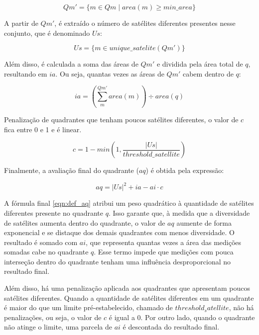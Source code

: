 \documentclass[cic,tc]{iiufrgs}
\begin{document}
\begin{equation} \label{eqn:def_qm_line}
Qm' = \{ m \in Qm \mid area\left(m\right) \ge min\_area \}
\end{equation}

A partir de $Qm'$, é extraído o número de satélites diferentes presentes nesse conjunto, que é denominado $Us$: \par

\begin{equation} \label{eqn:def_us}
Us = \{ m \in unique\_satelite\left(Qm'\right) \}
\end{equation}

Além disso, é calculada a soma das áreas de $Qm'$ e dividida pela área total de $q$, resultando em $ia$. Ou seja, quantas vezes as áreas de $Qm'$ cabem dentro de $q$: \par

\begin{equation} \label{eqn:def_ia}
ia = \left(\sum_{m}^{Qm'} area\left(m\right)\right) \div area(q)
\end{equation}

Penalização de quadrantes que tenham poucos satélites diferentes, o valor de $c$ fica entre 0 e 1 e é linear. \par

\begin{equation} \label{eqn:def_c}
c = 1 - min\left(1, \frac{|Us|}{threshold\_satellite}\right)
\end{equation}

Finalmente, a avaliação final do quadrante ($aq$) é obtida pela expressão: \par

\begin{equation} \label{eqn:def_aq}
aq = |Us|^2 + ia - ai \cdot c
\end{equation}

A fórmula final \ref{eqn:def_aq} atribui um peso quadrático à quantidade de satélites diferentes presente no quadrante $q$. Isso garante que, à medida que a diversidade de satélites aumenta dentro do quadrante, o valor de $aq$ aumente de forma exponencial e se distaque dos demais quadrantes com menos diversidade. O resultado é somado com $ai$, que representa quantas vezes a área das medições somadas cabe no quadrante $q$. Esse termo impede que medições com pouca interseção dentro do quadrante tenham uma influência desproporcional no resultado final. \par

Além disso, há uma penalização aplicada aos quadrantes que apresentam poucos satélites diferentes. Quando a quantidade de satélites diferentes em um quadrante é maior do que um limite pré-estabelecido, chamado de $threshold_satellite$, não há penalizações, ou seja, o valor de $c$ é igual a 0. Por outro lado, quando o quadrante não atinge o limite, uma parcela de $ai$ é descontada do resultado final. \par
\end{document}
